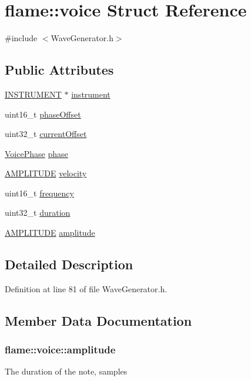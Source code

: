 \hypertarget{structflame_1_1voice}{\section{flame\-:\-:voice Struct Reference}
\label{structflame_1_1voice}
}


{\ttfamily \#include $<$Wave\-Generator.\-h$>$}

\subsection*{Public Attributes}
\begin{DoxyCompactItemize}
\item 
\hyperlink{namespaceflame_a7f0c5adbd1329cd2947d15e6af02dbf1}{I\-N\-S\-T\-R\-U\-M\-E\-N\-T} $\ast$ \hyperlink{structflame_1_1voice_aa2aa1f4b2ce3a2e90a123b2a99d4878b}{instrument}
\item 
uint16\-\_\-t \hyperlink{structflame_1_1voice_a897fe7f475e9bd1ff4115dd90ad80ecf}{phase\-Offset}
\item 
uint32\-\_\-t \hyperlink{structflame_1_1voice_af850619ff5aa4d53276cc3dafd7d4bc8}{current\-Offset}
\item 
\hyperlink{namespaceflame_a64ac4f87e54f07ae6c013cdd48d97822}{Voice\-Phase} \hyperlink{structflame_1_1voice_aae5caf10d82550f97fccea9f184d9ed2}{phase}
\item 
\hyperlink{namespaceflame_a7f6447252c60127b805475b293831f99}{A\-M\-P\-L\-I\-T\-U\-D\-E} \hyperlink{structflame_1_1voice_adb0641815db4aacb1fe2fc90b605e4c1}{velocity}
\item 
uint16\-\_\-t \hyperlink{structflame_1_1voice_aec3efeb3d7db126697063f95f57d4696}{frequency}
\item 
uint32\-\_\-t \hyperlink{structflame_1_1voice_a7eee8064edb15ee001e43a604d94fb79}{duration}
\item 
\hyperlink{namespaceflame_a7f6447252c60127b805475b293831f99}{A\-M\-P\-L\-I\-T\-U\-D\-E} \hyperlink{structflame_1_1voice_ac1c8f2531ec8ec72c2f2eb2c5aab7877}{amplitude}
\end{DoxyCompactItemize}


\subsection{Detailed Description}


Definition at line 81 of file Wave\-Generator.\-h.



\subsection{Member Data Documentation}
\hypertarget{structflame_1_1voice_ac1c8f2531ec8ec72c2f2eb2c5aab7877}{
\subsubsection[{amplitude}]{ flame\-::voice\-::amplitude}}\label{structflame_1_1voice_ac1c8f2531ec8ec72c2f2eb2c5aab7877}
The duration of the note, samples 


